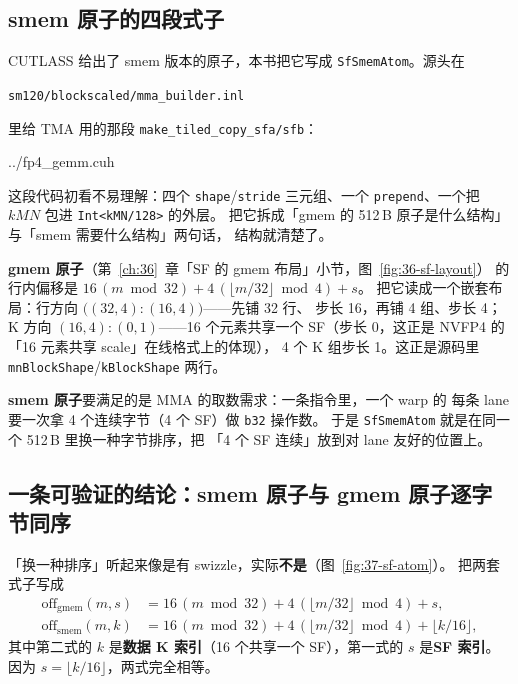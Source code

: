 \subsection{smem 原子的四段式子}

CUTLASS 给出了 smem 版本的原子，本书把它写成
\texttt{SfSmemAtom}。源头在
\begin{center}
\texttt{sm120/\allowbreak blockscaled/\allowbreak mma\_builder.inl}
\end{center}
里给 TMA 用的那段 \texttt{make\_tiled\_copy\_sfa/sfb}：

\begin{lstinputlisting}[linerange={527-547},firstnumber=auto,
  title={fp4\_gemm.cuh L527-547（SfSmemAtom：四个 shape/stride 三元组）}]{../fp4_gemm.cuh}
\end{lstinputlisting}

这段代码初看不易理解：四个 \texttt{shape}/\texttt{stride} 三元组、一个
\texttt{prepend}、一个把 $kMN$ 包进 \texttt{Int<kMN/128>} 的外层。
把它拆成「gmem 的 512\,B 原子是什么结构」与「smem 需要什么结构」两句话，
结构就清楚了。

\textbf{gmem 原子}（第~\ref{ch:36}~章「SF 的 gmem 布局」小节，图~\ref{fig:36-sf-layout}）
的行内偏移是 $16\,(m\bmod 32) + 4\,(\lfloor m/32\rfloor\bmod 4) + s$。
把它读成一个嵌套布局：行方向 $\bigl((32,4){:}(16,4)\bigr)$——先铺 32 行、
步长 16，再铺 4 组、步长 4；K 方向 $(16,4){:}(0,1)$——16 个元素共享一个
SF（步长 0，这正是 NVFP4 的「16 元素共享 scale」在线格式上的体现），
4 个 K 组步长 1。这正是源码里 \texttt{mnBlockShape}/\texttt{kBlockShape}
两行。

\textbf{smem 原子}要满足的是 MMA 的取数需求：一条指令里，一个 warp 的
每条 lane 要一次拿 4 个连续字节（4 个 SF）做 \texttt{b32} 操作数。
于是 \texttt{SfSmemAtom} 就是在同一个 512\,B 里换一种字节排序，把
「4 个 SF 连续」放到对 lane 友好的位置上。

\subsection{一条可验证的结论：smem 原子与 gmem 原子逐字节同序}

「换一种排序」听起来像是有 swizzle，实际\textbf{不是}（图~\ref{fig:37-sf-atom}）。
把两套式子写成
\begin{align}
  \mathrm{off}_{\mathrm{gmem}}(m,s) &= 16\,(m\bmod 32) + 4\,(\lfloor m/32\rfloor\bmod 4) + s, \\
  \mathrm{off}_{\mathrm{smem}}(m,k) &= 16\,(m\bmod 32) + 4\,(\lfloor m/32\rfloor\bmod 4) + \lfloor k/16\rfloor,
\end{align}
其中第二式的 $k$ 是\textbf{数据 K 索引}（16 个共享一个 SF），第一式的 $s$
是\textbf{SF 索引}。因为 $s = \lfloor k/16\rfloor$，两式完全相等。

